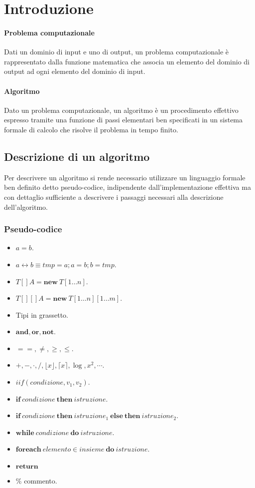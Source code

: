 \chapter{Introduzione}
\subsubsection{Problema computazionale}
Dati un dominio di input e uno di output, un problema computazionale \`e rappresentato dalla
funzione matematica che associa un elemento del dominio di output ad ogni elemento del dominio di
input.
\subsubsection{Algoritmo}
Dato un problema computazionale, un algoritmo \`e un procedimento effettivo espresso tramite una
funzione di passi elementari ben specificati in un sistema formale di calcolo che risolve il
problema in tempo finito.
\section{Descrizione di un algoritmo}
Per descrivere un algoritmo si rende necessario utilizzare un linguaggio formale ben definito detto
pseudo-codice, indipendente dall'implementazione effettiva ma con dettaglio sufficiente a
descrivere i passaggi necessari alla descrizione dell'algoritmo.
\subsection{Pseudo-codice}
\begin{itemize}
	\item $a=b$.
	\item $a\leftrightarrow b\equiv tmp=a; a=b; b=tmp$.
	\item $T[] A=\mathbf{new}\ T[1\dots n]$.
	\item $T[][] A=\mathbf{new}\ T[1\dots n][1\dots m]$.
	\item Tipi in grassetto.
	\item $\mathbf{and, or, not}$.
	\item $==, \neq, \ge, \le$.
	\item $+,-,\cdot, /, \lfloor x\rfloor, \lceil x\rceil, \log, x^2,\cdots$.
	\item $iif(condizione, v_1,v_2)$.
	\item $\mathbf{if}\ condizione\ \mathbf{then}\ istruzione$.
	\item $\mathbf{if}\ condizione\ \mathbf{then}\ istruzione_1\ \mathbf{else}\ \mathbf{then}\ istruzione_2$.
	\item $\mathbf{while}\ condizione\ \mathbf{do}\ istruzione$.
	\item $\mathbf{foreach}\ elemento\in insieme\ \mathbf{do}\ istruzione$.
	\item $\mathbf{return}$
	\item $\%$ commento.
\end{itemize}
